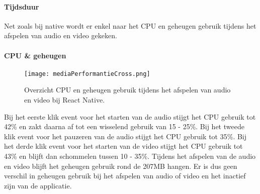 \paragraph{Tijdsduur}
Net zoals bij native wordt er enkel naar het CPU en geheugen gebruik tijdens 
het afspelen van audio en video gekeken.

\paragraph{CPU \& geheugen}
\begin{figure}[H]
    \centering
    \texttt{[image: mediaPerformantieCross.png]}
    \caption{Overzicht CPU en geheugen gebruik tijdens het afspelen van audio en video bij React Native.}
\end{figure}
Bij het eerste klik event voor het starten van de audio stijgt het
CPU gebruik tot 42\% en zakt daarna af tot een wisselend gebruik van 15 - 25\%. Bij het
tweede klik event voor het pauzeren van de audio stijgt het CPU gebruik tot 35\%. 
Bij het derde klik event voor het starten van de video stijgt het CPU gebruik tot 43\% en 
blijft dan schommelen tussen 10 - 35\%. Tijdens het afspelen van de audio en video blijft 
het geheugen gebruik rond de 207MB hangen. Er is dus geen verschil in
geheugen gebruik bij het afspelen van audio of video en het inactief zijn van de applicatie.
